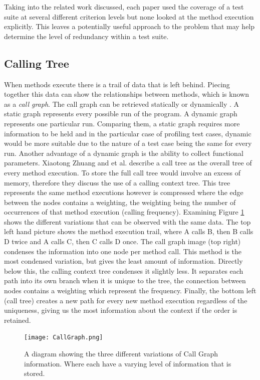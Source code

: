 \documentclass[11pt
              , a4paper
              , twoside
              , openright
              ]{report}
\begin{document}
Taking into the related work discussed, each paper used the coverage of a test suite at several different criterion levels but none looked at the method execution explicitly. This leaves a potentially useful approach to the problem that may help determine the level of redundancy within a test suite. 
\subsection{Calling Tree}
When methods execute there is a trail of data that is left behind. Piecing together this data can show the relationships between methods, which is known as a \textit{call graph}. The call graph can be retrieved statically or dynamically \cite{graham1982gprof}. A static graph represents every possible run of the program. A dynamic graph represents one particular run. Comparing them, a static graph requires more information to be held and in the particular case of profiling test cases, dynamic would be more suitable due to the nature of a test case being the same for every run. Another advantage of a dynamic graph is the ability to collect functional parameters. Xiaotong Zhuang and et al. \cite{Zhuang06accurate} describe a call tree as the overall tree of every method execution. To store the full call tree would involve an excess of memory, therefore they discuss the use of a calling context tree. This tree represents the same method executions however is compressed where the edge between the nodes contains a weighting, the weighting being the number of occurrences of that method execution (calling frequency). Examining Figure \ref{fig:callgraph} shows the different variations that can be observed with the same data. The top left hand picture shows the method execution trail, where A calls B, then B calls D twice and A calls C, then C calls D once. The call graph image (top right) condenses the information into one node per method call. This method is the most condensed variation, but gives the least amount of information. Directly below this, the calling context tree condenses it slightly less. It separates each path into its own branch when it is unique to the tree, the connection between nodes contains a weighting which represent the frequency. Finally, the bottom left (call tree) creates a new path for every new method execution regardless of the uniqueness, giving us the most information about the context if the order is retained.

\begin{figure}[h]
\begin{center}
\texttt{[image: CallGraph.png]}
\end{center}
\caption{A diagram showing the three different variations of Call Graph information. Where  each have a varying level of information that is stored.}
\label{fig:callgraph}
\end{figure}
\end{document}
